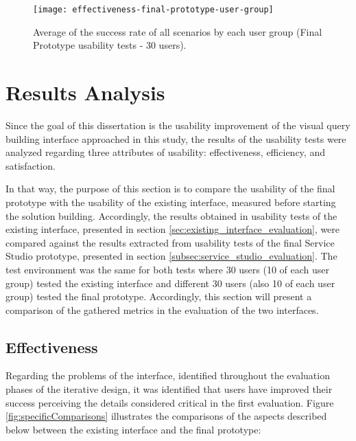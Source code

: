\begin{figure}[htbp]
	\centering
	\texttt{[image: effectiveness-final-prototype-user-group]}
	\caption{Average of the success rate of all scenarios by each user group (Final Prototype usability tests - 30 users).}
	\label{fig:effectivenessFinalPrototypeUserGroup}
\end{figure}



\section{Results Analysis}
\label{sec:results_analysis}

Since the goal of this dissertation is the usability improvement of the visual query building interface approached in this study, the results of the usability tests were analyzed regarding three attributes of usability: effectiveness, efficiency, and satisfaction.

In that way, the purpose of this section is to compare the usability of the final prototype with the usability of the existing interface, measured before starting the solution building. Accordingly, the results obtained in usability tests of the existing interface, presented in section \ref{sec:existing_interface_evaluation}, were compared against the results extracted from usability tests of the final Service Studio prototype, presented in section \ref{subsec:service_studio_evaluation}. The test environment was the same for both tests where 30 users (10 of each user group) tested the existing interface and different 30 users (also 10 of each user group) tested the final prototype. Accordingly, this section will present a comparison of the gathered metrics in the evaluation of the two interfaces.

\subsection{Effectiveness}
\label{subsec:effectiveness}

Regarding the problems of the interface, identified throughout the evaluation phases of the iterative design, it was identified that users have improved their success perceiving the details considered critical in the first evaluation. Figure \ref{fig:specificComparisons} illustrates the comparisons of the aspects described below between the existing interface and the final prototype:

